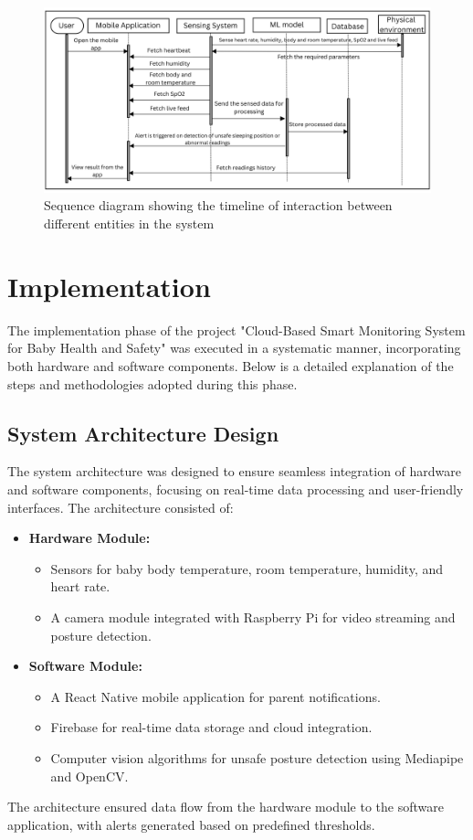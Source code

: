 \documentclass[conference]{IEEEtran}
\begin{document}
\begin{figure}[hbtp]
  \centering
  \includegraphics[scale=0.15]{./pic/seq.png}
  \caption{Sequence diagram showing the timeline of interaction between different entities in the system}
  \label{fig:sequence}
\end{figure}



\section{Implementation}
The implementation phase of the project "Cloud-Based Smart Monitoring System for Baby Health and Safety" was executed in a systematic manner, incorporating both hardware and software components. Below is a detailed explanation of the steps and methodologies adopted during this phase.

\subsection{System Architecture Design}
The system architecture was designed to ensure seamless integration of hardware and software components, focusing on real-time data processing and user-friendly interfaces. The architecture consisted of:
\begin{itemize}
  \item \textbf{Hardware Module:}
   \begin{itemize}
    \item Sensors for baby body temperature, room temperature, humidity, and heart rate.
    \item A camera module integrated with Raspberry Pi for video streaming and posture detection.
  \end{itemize}
  \item \textbf{Software Module:}
  \begin{itemize}
    \item A React Native mobile application for parent notifications.
    \item Firebase for real-time data storage and cloud integration.
    \item Computer vision algorithms for unsafe posture detection using Mediapipe and OpenCV.
  \end{itemize}
\end{itemize}
The architecture ensured data flow from the hardware module to the software application, with alerts generated based on predefined thresholds.
\end{document}
